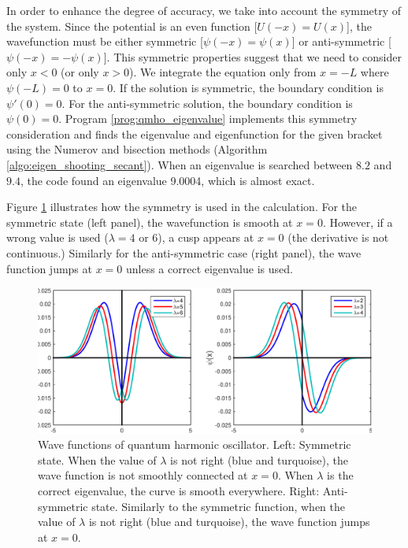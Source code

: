 In order to enhance the degree of accuracy, we take into account the symmetry of the system. Since the potential is an even function [$U(-x)=U(x)$], the wavefunction must be either symmetric [$\psi(-x)=\psi(x)$] or anti-symmetric [$\psi(-x) = - \psi(x)$].
This symmetric properties suggest that we need to consider only $x<0$ (or only $x>0$).  We integrate the equation only from $x=-L$ where $\psi(-L)=0$ to $x=0$. If the solution is symmetric, the boundary condition is $\psi'(0)=0$.  For the anti-symmetric solution, the boundary condition is $\psi(0)=0$.  Program \ref{prog:qmho_eigenvalue} implements this symmetry consideration and finds the eigenvalue and eigenfunction for the given bracket using the Numerov and bisection methods (Algorithm \ref{algo:eigen_shooting_secant}). When an eigenvalue is searched between $8.2$ and $9.4$, the code found an eigenvalue 9.0004, which is almost exact.

Figure \ref{fig:qmho_mismatch} illustrates how the symmetry is used in the calculation.  For the symmetric state (left panel), the wavefunction is smooth at $x=0$.  However, if a wrong value is used ($\lambda=4 \text{ or } 6$), a cusp appears at $x=0$ (the derivative is not continuous.)  Similarly for the anti-symmetric case (right panel), the wave function jumps at $x=0$ unless a correct eigenvalue is used. 


\begin{figure}
   \centering
   \includegraphics[width=4.5in]{07.ode3/qmho_mismatch.pdf}
   \caption{Wave functions of quantum harmonic oscillator. Left: Symmetric state. When the value of $\lambda$ is not right (blue and turquoise), the wave function is not smoothly connected at $x=0$.  When $\lambda$ is the correct eigenvalue, the curve is smooth everywhere.
      Right: Anti-symmetric state. Similarly to the symmetric function, when the value of $\lambda$ is not right (blue and turquoise), the wave function jumps at $x=0$.}
   \label{fig:qmho_mismatch}
\end{figure}


